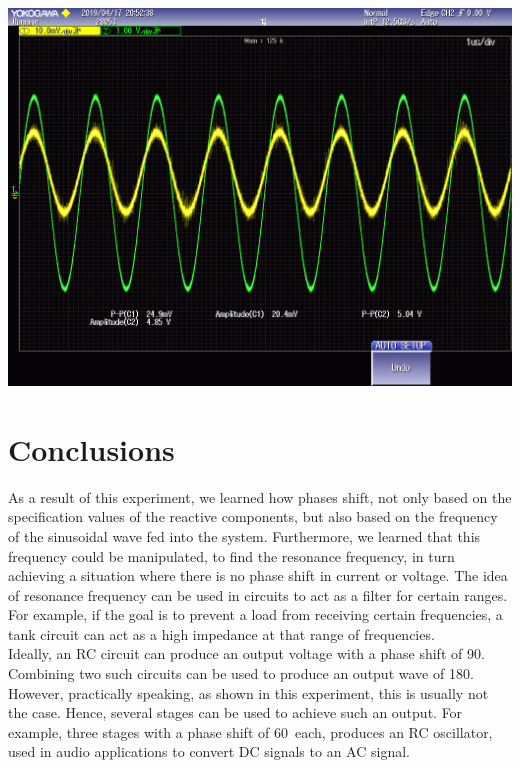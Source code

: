 \documentclass[journal]{IEEEtran}
\begin{document}
\begingroup
    \centering
    \medskip
    \includegraphics[width=\columnwidth]{images/lab8_012.png}
    \label{fig:phaseshift40}
    \medskip
\endgroup

\section{Conclusions}
\noindent As a result of this experiment, we learned how phases shift, not only based on the specification values of the reactive components, but also based on the frequency of the sinusoidal wave fed into the system. Furthermore, we learned that this frequency could be manipulated, to find the resonance frequency, in turn achieving a situation where there is no phase shift in current or voltage. The idea of resonance frequency can be used in circuits to act as a filter for certain ranges. For example, if the goal is to prevent a load from receiving certain frequencies, a tank circuit can act as a high impedance at that range of frequencies. \\

\noindent Ideally, an RC circuit can produce an output voltage with a phase shift of 90\degree. Combining two such circuits can be used to produce an output wave of 180\degree. However, practically speaking, as shown in this experiment, this is usually not the case. Hence, several stages can be used to achieve such an output. For example, three stages with a phase shift of 60\degree \, each, produces an RC oscillator, used in audio applications to convert DC signals to an AC signal. 

\printbibliography
\end{document}

